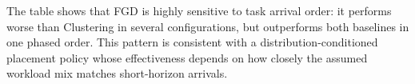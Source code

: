 \documentclass[conference]{IEEEtran}
\begin{document}
The table shows that FGD is highly sensitive to task arrival order: it performs worse than Clustering in several configurations, but outperforms both baselines in one phased order. This pattern is consistent with a distribution-conditioned placement policy whose effectiveness depends on how closely the assumed workload mix matches short-horizon arrivals.
\end{document}
